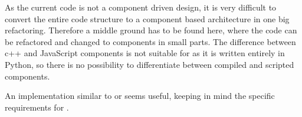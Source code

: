 As the current code is not a component driven design, it is very difficult to convert the entire code structure to a
component based architecture in one big refactoring. Therefore a middle ground has to be found here, where the code can
be refactored and changed to components in small parts. The difference between c++ and JavaScript components is not suitable
for \UH{} as it is written entirely in Python, so there is no possibility to differentiate between compiled and scripted
components.

An implementation similar to \BOW{} or \GLEST{} seems useful, keeping in mind the specific requirements for \UH{}.

